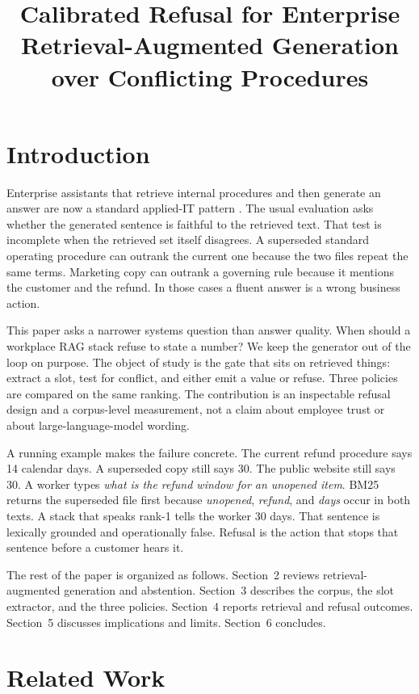 \documentclass{icaiit2027}
\title{Calibrated Refusal for Enterprise Retrieval-Augmented Generation over Conflicting Procedures}
\begin{document}
\maketitle

\section{Introduction}

Enterprise assistants that retrieve internal procedures and then generate an answer are now a standard applied-IT pattern \cite{lewis2020}. The usual evaluation asks whether the generated sentence is faithful to the retrieved text. That test is incomplete when the retrieved set itself disagrees. A superseded standard operating procedure can outrank the current one because the two files repeat the same terms. Marketing copy can outrank a governing rule because it mentions the customer and the refund. In those cases a fluent answer is a wrong business action.

This paper asks a narrower systems question than answer quality. When should a workplace RAG stack refuse to state a number? We keep the generator out of the loop on purpose. The object of study is the gate that sits on retrieved things: extract a slot, test for conflict, and either emit a value or refuse. Three policies are compared on the same ranking. The contribution is an inspectable refusal design and a corpus-level measurement, not a claim about employee trust or about large-language-model wording.

A running example makes the failure concrete. The current refund procedure says 14 calendar days. A superseded copy still says 30. The public website still says 30. A worker types \emph{what is the refund window for an unopened item}. BM25 returns the superseded file first because \emph{unopened}, \emph{refund}, and \emph{days} occur in both texts. A stack that speaks rank-1 tells the worker 30 days. That sentence is lexically grounded and operationally false. Refusal is the action that stops that sentence before a customer hears it.

The rest of the paper is organized as follows. Section~2 reviews retrieval-augmented generation and abstention. Section~3 describes the corpus, the slot extractor, and the three policies. Section~4 reports retrieval and refusal outcomes. Section~5 discusses implications and limits. Section~6 concludes.

\section{Related Work}
\end{document}
